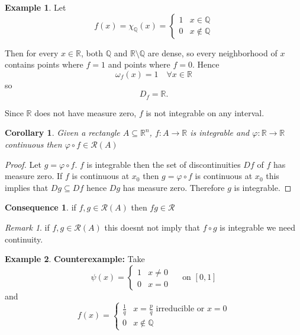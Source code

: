 \documentclass[11pt,openany]{book}
\theoremstyle{plain}
\newtheorem{corollary}{Corollary}[chapter]
\theoremstyle{definition}
\newtheorem{example}{Example}[chapter]
\newtheorem{consequence}{Consequence}[chapter]
\theoremstyle{remark}
\newtheorem{remark}{Remark}[chapter]
\newcommand{\R}{\mathbb{R}}
\newcommand{\Q}{\mathbb{Q}}
\begin{document}
\begin{example}
    Let 
    \[
    f(x) = \chi_{\Q}(x) = 
    \begin{cases}
        1 & x \in \Q \\
        0 & x \notin \Q
    \end{cases}
    \]

    Then for every $x \in \R$, both $\Q$ and $\R \setminus \Q$ are dense, so every neighborhood of $x$ contains points where $f=1$ and points where $f=0$. Hence
    \[
    \omega_f(x) = 1 \quad \forall x \in \R
    \]
    so
    \[
    D_f = \R.
    \]

    Since $\R$ does not have measure zero, $f$ is not integrable on any interval.
\end{example}


\begin{corollary}
    Given a rectangle $A \subseteq \R^n$, $f: A \to \R$ is integrable and $\varphi: \R \to \R$ continuous then $\varphi \circ f \in \mathcal{R}(A)$
\end{corollary}

\begin{proof}
    Let $g = \varphi \circ f$. $f$ is integrable then the set of discontinuities $Df$ of $f$ has measure zero. If $f$ is continuous at $x_0$ then $g = \varphi \circ f$ is continuous at $x_0$ this implies that $Dg \subseteq Df$ hence $Dg$ has measure zero. Therefore $g$ is integrable.

\end{proof}

\begin{consequence}
if $f,g \in \mathcal{R}(A)$ then $fg \in \mathcal{R}$
\end{consequence}

\begin{remark}
    if $f,g \in \mathcal{R}(A)$ this doesnt not imply that $f \circ g$ is integrable we need continuity.
\end{remark}

\begin{example}
    \textbf{Counterexample:} Take \[\psi(x) = \begin{cases}
        1 & x \ne 0 \\
        0 & x =  0
    \end{cases}\quad  \text{ on } [0,1]\] and \[f(x) = \begin{cases}
        \frac1q & x = \frac{p}{q} \text{ irreducible or } x = 0\\
        0 & x \notin \Q
    \end{cases}\]
\end{example}
\end{document}
